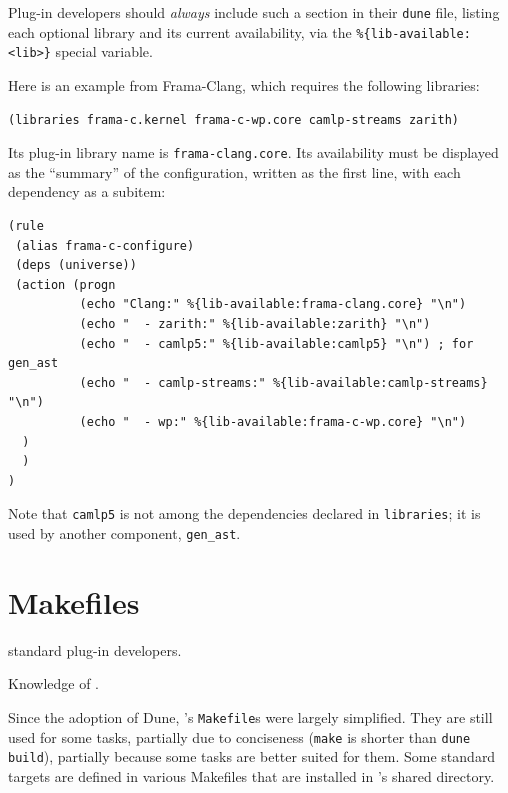 Plug-in developers should {\em always} include such a section in their
\verb|dune| file, listing each optional library and its current availability,
via the \verb|%{lib-available:<lib>}| special variable.

Here is an example from \textsf{Frama-Clang}, which requires the following
libraries:

\begin{lstlisting}[language=Dune]
(libraries frama-c.kernel frama-c-wp.core camlp-streams zarith)
\end{lstlisting}

Its plug-in library name is \verb|frama-clang.core|. Its availability
must be displayed as the ``summary'' of the configuration, written as the first
line, with each dependency as a subitem:

\begin{lstlisting}[language=Dune]
(rule
 (alias frama-c-configure)
 (deps (universe))
 (action (progn
          (echo "Clang:" %{lib-available:frama-clang.core} "\n")
          (echo "  - zarith:" %{lib-available:zarith} "\n")
          (echo "  - camlp5:" %{lib-available:camlp5} "\n") ; for gen_ast
          (echo "  - camlp-streams:" %{lib-available:camlp-streams} "\n")
          (echo "  - wp:" %{lib-available:frama-c-wp.core} "\n")
  )
  )
)
\end{lstlisting}

Note that \verb|camlp5| is not among the dependencies declared in
\verb|libraries|; it is used by another component, \verb|gen_ast|.


\section{\framac Makefiles}\label{adv:make}

\begin{target}standard plug-in developers.\end{target}

\begin{prereq}
  Knowledge of \make.
\end{prereq}

Since the adoption of Dune, \framac's \texttt{Makefile}s were largely
simplified. They are still used for some tasks, partially due to conciseness
(\verb|make| is shorter than \verb|dune build|), partially because some tasks
are better suited for them. Some standard targets are defined in various
Makefiles that are installed in \framac's shared directory.

